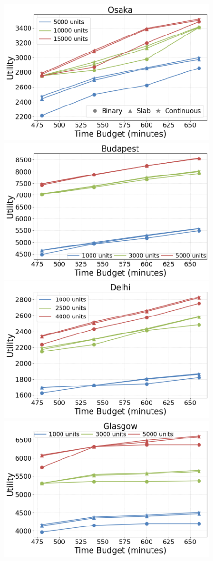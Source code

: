 \begin{figure}[t]
	\centering
    \includegraphics[width=0.65\columnwidth]{plots/exp1-osaka.png}
    \includegraphics[width=0.65\columnwidth]{plots/exp1-budapest.png}
    \includegraphics[width=0.65\columnwidth]{plots/exp1-delhi.png}
    \includegraphics[width=0.65\columnwidth]{plots/exp1-glasgow.png}

\end{figure}
